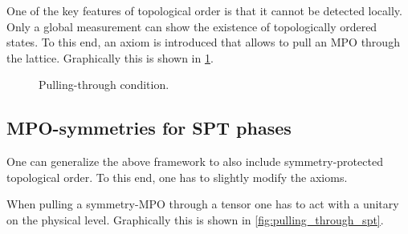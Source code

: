     \begin{axiom}
        One of the key features of topological order is that it cannot be detected locally. Only a global measurement can show the existence of topologically ordered states. To this end, an axiom is introduced that allows to pull an MPO through the lattice. Graphically this is shown in \cref{fig:pulling_through}.
    \end{axiom}

    \begin{figure}[ht!]
        \centering
        \caption{Pulling-through condition.}
        \label{fig:pulling_through}
    \end{figure}

\subsection{MPO-symmetries for SPT phases}

    One can generalize the above framework to also include symmetry-protected topological order. To this end, one has to slightly modify the axioms.
    \begin{axiom}
        When pulling a symmetry-MPO through a tensor one has to act with a unitary on the physical level. Graphically this is shown in \cref{fig:pulling_through_spt}.
    \end{axiom}

